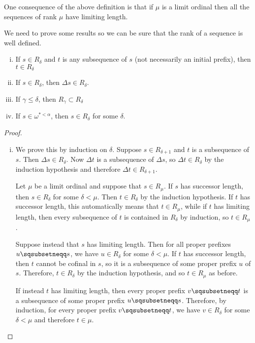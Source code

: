 \documentclass[11pt]{article} %
\begin{document}
One consequence of the above definition is that if $\mu$ is a limit ordinal then all the sequences of rank $\mu$ have limiting length.

We need to prove some results so we can be sure that the rank of a sequence is well defined.  

\begin{proposition}
  \label{RankProposition}
  \begin{enumerate}[i)]
    \item If $s\in R_\delta$ and $t$ is any subsequence of $s$ (not necessarily an initial prefix), then $t\in R_\delta$
    \item If $s\in R_\delta$, then $\Delta s\in R_\delta$.
    \item If $\gamma\le\delta$, then $R_\gamma\subset R_\delta$
    \item If $s\in\omega^{*<\alpha}$, then $s\in R_\delta$ for some $\delta$.
  \end{enumerate}

  \begin{proof}
    \begin{enumerate}[(i): ]
      \item We prove this by induction on $\delta$.  Suppose $s\in R_{\delta+1}$ and $t$ is a subsequence of $s$.  Then $\Delta s\in R_\delta$.  Now $\Delta t$ is a subsequence of $\Delta s$, so $\Delta t\in R_\delta$ by the induction hypothesis and therefore $\Delta t\in R_{\delta +1}$.  

        Let $\mu$ be a limit ordinal and suppose that $s\in R_\mu$.  If $s$ has successor length, then $s\in R_\delta$ for some $\delta<\mu$.  Then $t\in R_\delta$ by the induction hypothesis.  If $t$ has successor length, this automatically means that $t\in R_\mu$, while if $t$ has limiting length, then every subsequence of $t$ is contained in $R_\delta$ by induction, so $t\in R_\mu$.  

        Suppose instead that $s$ has limiting length.  Then for all proper prefixes $u\pprefix s$, we have $u\in R_\delta$ for some $\delta<\mu$.  If $t$ has successor length, then $t$ cannot be cofinal in $s$, so it is a subsequence of some proper prefix $u$ of $s$.  Therefore, $t\in R_\delta$ by the induction hypothesis, and so $t\in R_\mu$ as before.  

        If instead $t$ has limiting length, then every proper prefix $v\pprefix t$ is a subsequence of some proper prefix $u\pprefix s$.  Therefore, by induction, for every proper prefix $v\pprefix t$, we have $v\in R_\delta$ for some $\delta<\mu$ and therefore $t\in\mu$.  


\end{enumerate}
\end{proof}
\end{proposition}
\end{document}
